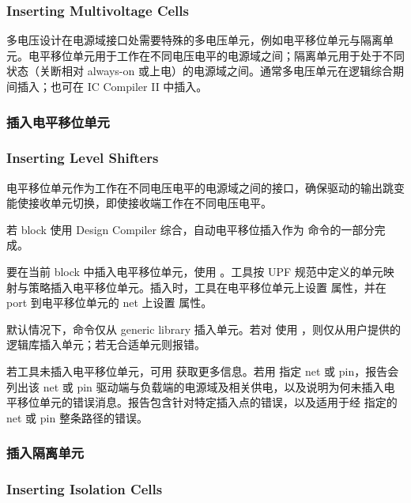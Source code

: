 \subsubsection*{Inserting Multivoltage Cells}

多电压设计在电源域接口处需要特殊的多电压单元，例如电平移位单元与隔离单元。电平移位单元用于工作在不同电压电平的电源域之间；隔离单元用于处于不同状态（关断相对 always-on 或上电）的电源域之间。通常多电压单元在逻辑综合期间插入；也可在 IC Compiler II 中插入。

\subsubsection{插入电平移位单元}
\subsubsection*{Inserting Level Shifters}

电平移位单元作为工作在不同电压电平的电源域之间的接口，确保驱动的输出跳变能使接收单元切换，即使接收端工作在不同电压电平。

\begin{noteBox}
若 block 使用 Design Compiler 综合，自动电平移位插入作为  命令的一部分完成。
\end{noteBox}

要在当前 block 中插入电平移位单元，使用 。工具按 UPF 规范中定义的单元映射与策略插入电平移位单元。插入时，工具在电平移位单元上设置  属性，并在 port 到电平移位单元的 net 上设置  属性。

默认情况下，命令仅从 generic library 插入单元。若对  使用 ，则仅从用户提供的逻辑库插入单元；若无合适单元则报错。

若工具未插入电平移位单元，可用  获取更多信息。若用  指定 net 或 pin，报告会列出该 net 或 pin 驱动端与负载端的电源域及相关供电，以及说明为何未插入电平移位单元的错误消息。报告包含针对特定插入点的错误，以及适用于经  指定的 net 或 pin 整条路径的错误。

\subsubsection{插入隔离单元}
\subsubsection*{Inserting Isolation Cells}

